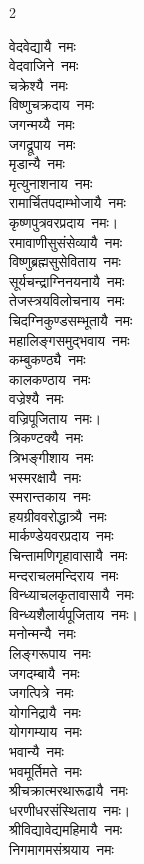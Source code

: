 \begin{multicols}{2}
\begin{flushleft}
वेदवेद्यायै~नमः\\
वेदवाजिने~नमः\\
चक्रेश्यै~नमः\\
विष्णुचक्रदाय~नमः\\
जगन्मय्यै~नमः\\
जगद्रूपाय~नमः\\
मृडान्यै~नमः\\
मृत्युनाशनाय~नमः\\
रामार्चितपदाम्भोजायै~नमः\\
कृष्णपुत्रवरप्रदाय~नमः।\hfill{}\\
रमावाणीसुसंसेव्यायै~नमः\\
विष्णुब्रह्मसुसेविताय~नमः\\
सूर्यचन्द्राग्निनयनायै~नमः\\
तेजस्त्रयविलोचनाय~नमः\\
चिदग्निकुण्डसम्भूतायै~नमः\\
महालिङ्गसमुद्भवाय~नमः\\
कम्बुकण्ठ्यै~नमः\\
कालकण्ठाय~नमः\\
वज्रेश्यै~नमः\\
वज्रिपूजिताय~नमः।\hfill{}\\
त्रिकण्टक्यै~नमः\\
त्रिभङ्गीशाय~नमः\\
भस्मरक्षायै~नमः\\
स्मरान्तकाय~नमः\\
हयग्रीववरोद्धात्र्यै~नमः\\
मार्कण्डेयवरप्रदाय~नमः\\
चिन्तामणिगृहावासायै~नमः\\
मन्दराचलमन्दिराय~नमः\\
विन्ध्याचलकृतावासायै~नमः\\
विन्ध्यशैलार्यपूजिताय~नमः।\hfill{}\\
मनोन्मन्यै~नमः\\
लिङ्गरूपाय~नमः\\
जगदम्बायै~नमः\\
जगत्पित्रे~नमः\\
योगनिद्रायै~नमः\\
योगगम्याय~नमः\\
भवान्यै~नमः\\
भवमूर्तिमते~नमः\\
श्रीचक्रात्मरथारूढायै~नमः\\
धरणीधरसंस्थिताय~नमः।\hfill{}\\
श्रीविद्यावेद्यमहिमायै~नमः\\
निगमागमसंश्रयाय~नमः\\

\end{flushleft}
\end{multicols}
